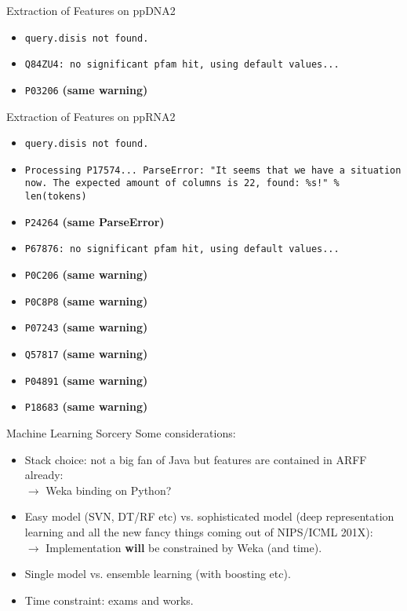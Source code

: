 \documentclass[pdf]
{beamer}
\begin{document}
\begin{frame}{Extraction of Features on ppDNA2}
	\begin{itemize}
		\item \texttt{query.disis not found.}
		\item \texttt{Q84ZU4: no significant pfam hit, using default values...}
		\item \texttt{P03206} \textbf{(same warning)}
	\end{itemize}
\end{frame}

\begin{frame}{Extraction of Features on ppRNA2}
	\begin{itemize}
		\item \texttt{query.disis not found.}
		\item \texttt{Processing P17574... ParseError: "It seems that we have a situation now. The expected amount of columns is 22, found: \%s!" \% len(tokens)}\\
		\item \texttt{P24264} \textbf{(same ParseError)}
		\item \texttt{P67876: no significant pfam hit, using default values...}
		\item \texttt{P0C206} \textbf{(same warning)}
		\item \texttt{P0C8P8} \textbf{(same warning)}
		\item \texttt{P07243} \textbf{(same warning)}
		\item \texttt{Q57817} \textbf{(same warning)}
		\item \texttt{P04891} \textbf{(same warning)}
		\item \texttt{P18683} \textbf{(same warning)}
	\end{itemize}
\end{frame}

\begin{frame}{Machine Learning Sorcery}
	Some considerations:
	\begin{itemize}
		\item Stack choice: not a big fan of Java but features are contained in ARFF already:\\
			$\rightarrow$ Weka binding on Python?
		\item Easy model (SVN, DT/RF etc) vs. sophisticated model (deep representation learning and all the new fancy things coming out of NIPS/ICML 201X):\\
		$\rightarrow$ Implementation \textbf{will} be constrained by Weka (and time).
		
		\item Single model vs. ensemble learning (with boosting etc).
		\item Time constraint: exams and works.
	\end{itemize}
\end{frame}
\end{document}
